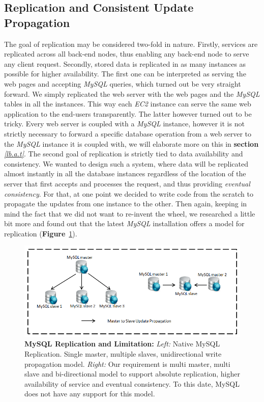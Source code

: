 \documentclass[12pt]{article}
\begin{document}
\subsection{Replication and Consistent Update Propagation} 
The goal of replication may be considered two-fold in nature. Firstly, services are
replicated across all back-end nodes, thus enabling any back-end node to serve
any client request. Secondly, stored data is replicated in as many instances as
possible for higher availability. The first one can be interpreted as serving the web pages and accepting \emph{MySQL} queries, which turned out be very straight forward. We simply replicated the web server with
the web pages and the \emph{MySQL} tables in all the instances. This way each
\emph{EC2} instance can serve the same web application to the end-users
transparently. The latter however turned out to be tricky. Every web server is
coupled with a \emph{MySQL} instance, however it is not strictly necessary to
forward a specific database operation from a web server to the \emph{MySQL}
instance it is coupled with, we will elaborate more on this in \textbf{section}
\emph{\ref{lb.a.t}}. The second goal of replication is strictly tied to data
availability and consistency. We wanted to design such a system, where data will
be replicated almost instantly in all the database instances regardless of the
location of the server that first accepts and processes the request, and thus
providing \emph{eventual consistency}. For that, at one point we decided to write code
from the scratch to propagate the updates from one instance to the other. Then
again, keeping in mind the fact that we did not want to re-invent the wheel, we
researched a little bit more and found out that the latest \emph{MySQL}
installation offers a model for replication \cite{mysql-replication}(\textbf{Figure}~\ref{fig:mysqlreplication}).  
\begin{figure}[H] 
\centering
\includegraphics[scale=0.80]{Images/figure6.PNG} 
\caption{\textbf{MySQL Replication and Limitation:} 
\emph{Left: }Native MySQL Replication. Single master, multiple slaves, unidirectional 
write propagation model.  
\emph{Right:}
Our requirement is multi master, multi slave and bi-directional model to support
absolute replication, higher availability of service and eventual consistency. To
this date, MySQL does not have any support for this model.}
\label{fig:mysqlreplication} 
\end{figure} 
\end{document}
